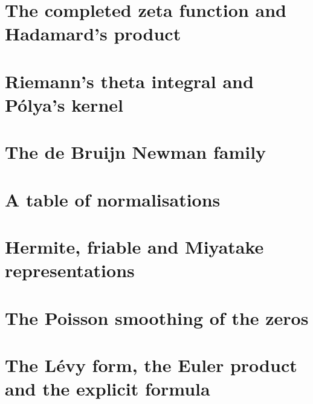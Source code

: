 \section{The completed zeta function and Hadamard's product}

\section{Riemann's theta integral and P\'olya's kernel}

\section{The de Bruijn Newman family}

\section{A table of normalisations}

\section{Hermite, friable and Miyatake representations}

\section{The Poisson smoothing of the zeros}

\section{The L\'evy form, the Euler product and the explicit formula}

